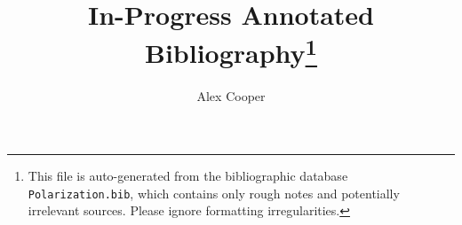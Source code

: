 \documentclass[a4paper,10pt]{article}
\title{In-Progress Annotated Bibliography\thanks{
This file is auto-generated from the bibliographic database 
{\tt Polarization.bib}, which contains only rough notes and 
potentially irrelevant sources. Please 
ignore formatting irregularities.
}}
\author{Alex Cooper}
\begin{document}
\maketitle
\nocite{*}



\end{document}
